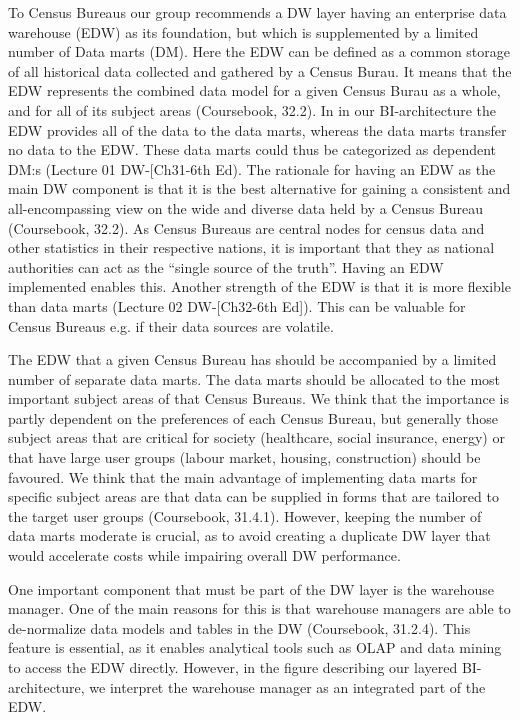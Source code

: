 To Census Bureaus our group recommends a DW layer having an enterprise data warehouse (EDW) 
as its foundation, but which is supplemented by a limited number of Data marts (DM). 
Here the EDW can be defined as a common storage of all historical data collected and 
gathered by a Census Burau. 
It means that the EDW represents the combined data model for a given Census Burau as a whole, 
and for all of its subject areas (Coursebook, 32.2). 
In in our BI-architecture the EDW provides all of the data to the data marts, 
whereas the data marts transfer no data to the EDW. 
These data marts could thus be categorized as dependent DM:s (Lecture 01 DW-[Ch31-6th Ed). 
The rationale for having an EDW as the main DW component is that it is the best alternative for 
gaining a consistent and 
all-encompassing view on the wide and diverse data held by a Census Bureau (Coursebook, 32.2). 
As Census Bureaus are central nodes for census data and other statistics in their respective nations, 
it is important that they as national authorities can act as the “single source of the truth”. 
Having an EDW implemented enables this. 
Another strength of the EDW is that it is more flexible than data marts (Lecture 02 DW-[Ch32-6th Ed]). 
This can be valuable for Census Bureaus e.g. if their data sources are volatile.  

The EDW that a given Census Bureau has should be accompanied by a limited number of separate data marts. 
The data marts should be allocated to the most important subject areas of that Census Bureaus. 
We think that the importance is partly dependent on the preferences of each Census Bureau, 
but generally those subject areas that are critical for society (healthcare, social insurance, energy) 
or that have large user groups (labour market, housing, construction) should be favoured. 
We think that the main advantage of implementing data marts for specific subject areas are 
that data can be supplied in forms that are tailored to the target user groups  (Coursebook, 31.4.1). 
However, keeping the number of data marts moderate is crucial, as to avoid creating a duplicate DW layer 
that would accelerate costs while impairing overall DW performance.   

One important component that must be part of the DW layer is the warehouse manager. 
One of the main reasons for this is that warehouse managers are able to de-normalize data models and 
tables in the DW (Coursebook, 31.2.4). 
This feature is essential, as it enables analytical tools such as OLAP and 
data mining to access the EDW directly. 
However, in the figure describing our layered BI-architecture, 
we interpret the warehouse manager as an integrated part of the EDW.  

